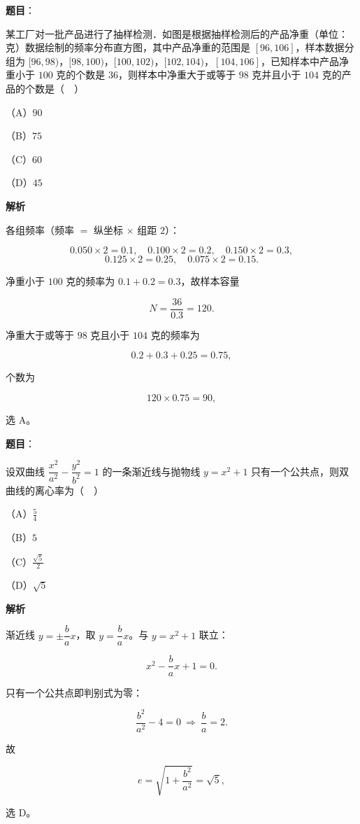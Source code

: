 \begin{answer}

\textbf{题目}：

某工厂对一批产品进行了抽样检测．如图是根据抽样检测后的产品净重（单位：克）数据绘制的频率分布直方图，其中产品净重的范围是 $[96,106]$，样本数据分组为 $[96,98)$，$[98,100)$，$[100,102)$，$[102,104)$，$[104,106]$，已知样本中产品净重小于 $100$ 克的个数是 $36$，则样本中净重大于或等于 $98$ 克并且小于 $104$ 克的产品的个数是（　）

（A）$90$

（B）$75$

（C）$60$

（D）$45$
\nopagebreak[4]
\begin{center}\end{center}
\nopagebreak[4]
\textbf{解析}

各组频率（频率 $=$ 纵坐标 $\times$ 组距 $2$）：

\nopagebreak[4]
\[0.050\times2=0.1,\quad 0.100\times2=0.2,\quad 0.150\times2=0.3,\]
\nopagebreak[4]
\[0.125\times2=0.25,\quad 0.075\times2=0.15 .\]

净重小于 $100$ 克的频率为 $0.1+0.2=0.3$，故样本容量

\nopagebreak[4]
\[N=\frac{36}{0.3}=120 .\]

净重大于或等于 $98$ 克且小于 $104$ 克的频率为

\nopagebreak[4]
\[0.2+0.3+0.25=0.75,\]

个数为

\nopagebreak[4]
\[120\times0.75=90,\]

选 A。


\end{answer}
\begin{answer}

\textbf{题目}：

设双曲线 $\dfrac{x^2}{a^2}-\dfrac{y^2}{b^2}=1$ 的一条渐近线与抛物线 $y=x^2+1$ 只有一个公共点，则双曲线的离心率为（　）

（A）$\frac54$

（B）$5$

（C）$\frac{\sqrt5}{2}$

（D）$\sqrt5$

\textbf{解析}

渐近线 $y=\pm\dfrac ba x$，取 $y=\dfrac ba x$。与 $y=x^2+1$ 联立：

\nopagebreak[4]
\[x^2-\frac ba x+1=0 .\]

只有一个公共点即判别式为零：

\nopagebreak[4]
\[\frac{b^2}{a^2}-4=0\ \Longrightarrow\ \frac ba=2 .\]

故

\nopagebreak[4]
\[e=\sqrt{1+\frac{b^2}{a^2}}=\sqrt5,\]

选 D。


\end{answer}
